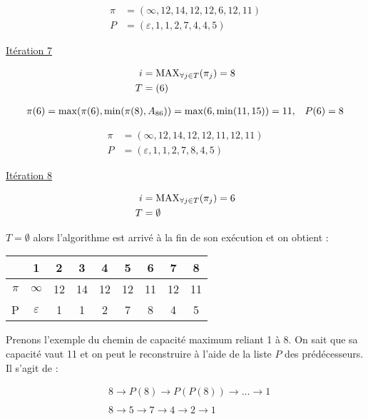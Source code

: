 \documentclass{article}
\begin{document}
\begin{align*}
  \pi &= (\infty,12,14,12,12,6,12,11)\\
  P &= (\varepsilon, 1, 1, 2, 7, 4, 4, 5)
\end{align*}

\underline{Itération 7}

\begin{align*}
  i &= \operatorname{MAX}_{\forall j \in T}(\pi_j) = 8\\
  T &= (6)
\end{align*}

\begin{align*}
  &\pi(6) = \operatorname{max}(\pi(6), \operatorname{min}(\pi(8), A_{86})) = \operatorname{max}(6, \operatorname{min}(11,15)) = 11, &P(6) = 8\\
\end{align*}

\begin{align*}
  \pi &= (\infty,12,14,12,12,11,12,11)\\
  P &= (\varepsilon, 1, 1, 2, 7, 8, 4, 5)
\end{align*}

\underline{Itération 8}

\begin{align*}
  i &= \operatorname{MAX}_{\forall j \in T}(\pi_j) = 6\\
  T &= \emptyset
\end{align*}

$T = \emptyset$ alors l'algorithme est arrivé à la fin de son
exécution et on obtient :

\begin{table}[H]

  \centering

  \begin{tabular}{c|cccccccc}
    
    & 1 & 2 & 3 & 4 & 5 & 6 & 7 & 8 \\
    \hline
    $\pi$ & $\infty$ & 12 & 14 & 12 & 12 & 11 & 12 & 11 \\
    P & $\varepsilon$ & 1 & 1 & 2 & 7 & 8 & 4 & 5 \\
  \end{tabular}

\end{table}

Prenons l'exemple du chemin de capacité maximum reliant 1 à 8. On sait
que sa capacité vaut 11 et on peut le reconstruire à l'aide de la
liste $P$ des prédécesseurs. Il s'agit de :

\begin{align*}
  &8 \rightarrow P(8) \rightarrow P(P(8)) \rightarrow \dots \rightarrow 1\\\\
  &8 \rightarrow 5 \rightarrow 7 \rightarrow 4 \rightarrow 2 \rightarrow 1
\end{align*}
\end{document}
